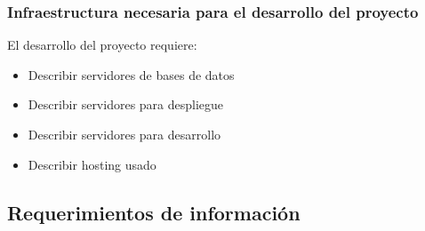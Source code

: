 \subsubsection{Infraestructura necesaria para el desarrollo del proyecto}
El desarrollo del proyecto requiere:
\begin{itemize}
  \item Describir servidores de bases de datos
  \item Describir servidores para despliegue
  \item Describir servidores para desarrollo
  \item Describir hosting usado
\end{itemize}

\subsection{Requerimientos de información}
\label{subsection:prop:info}

